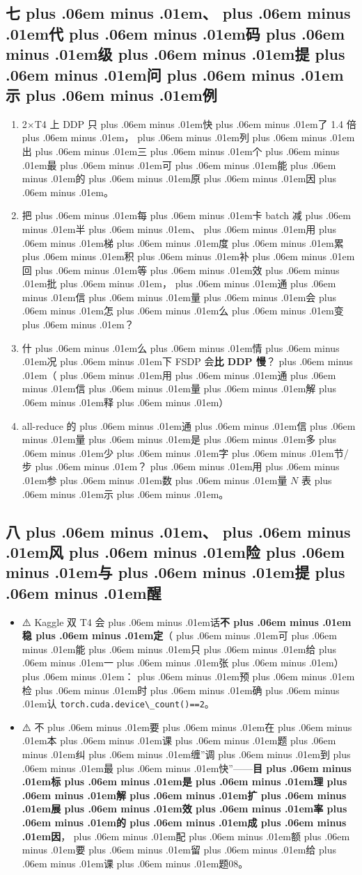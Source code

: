 \documentclass[
]{article}
\newcommand{\passthrough}[1]{#1}
\providecommand{\tightlist}{%
  \setlength{\itemsep}{0pt}\setlength{\parskip}{0pt}}
\def\zh#1{{\zhfont #1}}
\def\sym#1{{\symfont #1}}
\def\zhglue{\hskip0pt plus .06em minus .01em}
\begin{document}
\subsection{\zh{七\zhglue 、\zhglue 代\zhglue 码\zhglue 级\zhglue 提\zhglue 问\zhglue 示\zhglue 例}}\label{ux4e03ux4ee3ux7801ux7ea7ux63d0ux95eeux793aux4f8b}

\begin{enumerate}
\def\labelenumi{\arabic{enumi}.}
\tightlist
\item
  2\sym{×}T4 \zh{上} DDP \zh{只\zhglue 快\zhglue 了} 1.4 \zh{倍\zhglue ，\zhglue 列\zhglue 出\zhglue 三\zhglue 个\zhglue 最\zhglue 可\zhglue 能\zhglue 的\zhglue 原\zhglue 因\zhglue 。}
\item
  \zh{把\zhglue 每\zhglue 卡} batch \zh{减\zhglue 半\zhglue 、\zhglue 用\zhglue 梯\zhglue 度\zhglue 累\zhglue 积\zhglue 补\zhglue 回\zhglue 等\zhglue 效\zhglue 批\zhglue ，\zhglue 通\zhglue 信\zhglue 量\zhglue 会\zhglue 怎\zhglue 么\zhglue 变\zhglue ？}
\item
  \zh{什\zhglue 么\zhglue 情\zhglue 况\zhglue 下} FSDP \zh{会}\textbf{\zh{比} DDP \zh{慢}}\zh{？\zhglue （\zhglue 用\zhglue 通\zhglue 信\zhglue 量\zhglue 解\zhglue 释\zhglue ）}
\item
  all-reduce \zh{的\zhglue 通\zhglue 信\zhglue 量\zhglue 是\zhglue 多\zhglue 少\zhglue 字\zhglue 节}/\zh{步\zhglue ？\zhglue 用\zhglue 参\zhglue 数\zhglue 量} \(N\) \zh{表\zhglue 示\zhglue 。}
\end{enumerate}

\subsection{\zh{八\zhglue 、\zhglue 风\zhglue 险\zhglue 与\zhglue 提\zhglue 醒}}\label{ux516bux98ceux9669ux4e0eux63d0ux9192}

\begin{itemize}
\tightlist
\item
  \sym{⚠️} Kaggle \zh{双} T4 \zh{会\zhglue 话}\textbf{\zh{不\zhglue 稳\zhglue 定}}\zh{（\zhglue 可\zhglue 能\zhglue 只\zhglue 给\zhglue 一\zhglue 张\zhglue ）\zhglue ：\zhglue 预\zhglue 检\zhglue 时\zhglue 确\zhglue 认} \passthrough{\lstinline!torch.cuda.device\_count()==2!}\zh{。}
\item
  \sym{⚠️} \zh{不\zhglue 要\zhglue 在\zhglue 本\zhglue 课\zhglue 题\zhglue 纠\zhglue 缠}''\zh{调\zhglue 到\zhglue 最\zhglue 快}''------\textbf{\zh{目\zhglue 标\zhglue 是\zhglue 理\zhglue 解\zhglue 扩\zhglue 展\zhglue 效\zhglue 率\zhglue 的\zhglue 成\zhglue 因}}\zh{，\zhglue 配\zhglue 额\zhglue 要\zhglue 留\zhglue 给\zhglue 课\zhglue 题}08\zh{。}
\end{itemize}
\end{document}
